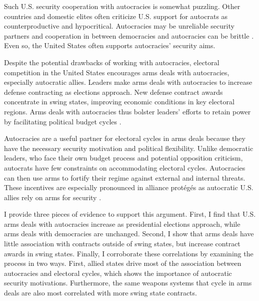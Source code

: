 \documentclass[12pt]{article}
\begin{document}
Such U.S. security cooperation with autocracies is somewhat puzzling.
Other countries and domestic elites often criticize U.S. support for autocrats as counterproductive and hypocritical. 
Autocracies may be unreliable security partners \citep{Gaubatz1996} and cooperation in between democracies and autocracies can be brittle \citep{Leeds1999}.
Even so, the United States often supports autocracies' security aims.  


Despite the potential drawbacks of working with autocracies, electoral competition in the United States encourages arms deals with autocracies, especially autocratic allies.
Leaders make arms deals with autocracies to increase defense contracting as elections approach.
New defense contract awards concentrate in swing states, improving economic conditions in key electoral regions.
Arms deals with autocracies thus bolster leaders' efforts to retain power by facilitating political budget cycles \citep{Tufte1978, Mintz1988, Mayer1995, DerouenHeo2000, Becker2021}. 


Autocracies are a useful partner for electoral cycles in arms deals because they have the necessary security motivation and political flexibility. 
Unlike democratic leaders, who face their own budget process and potential opposition criticism, autocrats have few constraints on accommodating electoral cycles.
Autocracies can then use arms to fortify their regime against external and internal threats.
These incentives are especially pronounced in alliance prot{\'e}g{\'e}s as autocratic U.S. allies rely on arms for security \citep{McManusYarhi-Milo2017}.


I provide three pieces of evidence to support this argument.
First, I find that U.S. arms deals with autocracies increase as presidential elections approach, while arms deals with democracies are unchanged. 
Second, I show that arms deals have little association with contracts outside of swing states, but increase contract awards in swing states. 
Finally, I corroborate these correlations by examining the process in two ways.
First, allied states drive most of the association between autocracies and electoral cycles, which shows the importance of autocratic security motivations. 
Furthermore, the same weapons systems that cycle in arms deals are also most correlated with more swing state contracts.
\end{document}
